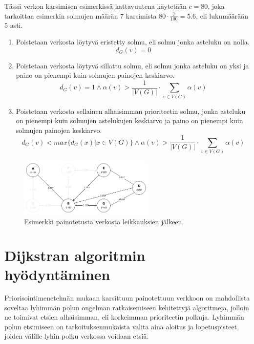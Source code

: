   Tässä verkon karsimisen esimerkissä kattavuutena käytetään \(c = 80\), joka tarkoittaa esimerkin solmujen määrän \(7\) karsimista \(80 \cdot \frac{7}{100} = 5.6\), eli lukumäärään \(5\) asti.

  \begin{enumerate}
    \item Poistetaan verkosta löytyvä eristetty solmu, eli solmu jonka asteluku on nolla.
    \[d_G(v) = 0\]
    \item Poistetaan verkosta löytyvä sillattu solmu, eli solmu jonka asteluku on yksi ja paino on pienempi kuin solmujen painojen keskiarvo.
    \[d_G(v) = 1  \land \alpha(v) > \frac{1}{|V(G)|} \cdot \sum\limits_{v \in V(G)} \alpha(v)\]
    \item Poistetaan verkosta sellainen alhaisimman prioriteetin solmu, jonka asteluku on pienempi kuin solmujen astelukujen keskiarvo ja paino on pienempi kuin solmujen painojen keskiarvo.
    \[d_G(v) < max\{d_G(x) | x \in V(G)\} \land \alpha(v) > \frac{1}{|V(G)|} \cdot \sum\limits_{v \in V(G)} \alpha(v)\]
  \end{enumerate}

  \begin{figure}[H]
    \centering
    \includegraphics[width=0.6\textwidth]{assets/painotettu-verkko-jalkeen.png}
    \caption{Esimerkki painotetusta verkosta leikkauksien jälkeen}
    \label{fig:painotettu-verkko-jalkeen}
  \end{figure}

\section{Dijkstran algoritmin hyödyntäminen} \label{ch:10_dijkstran_algoritmin_hyodyntaminen}

  Priorisointimenetelmän mukaan karsittuun painotettuun verkkoon on mahdollista soveltaa lyhimmän polun ongelman ratkaisemiseen kehitettyjä algoritmeja, jolloin ne toimivat etsien alhaisimman, eli korkeimman prioriteetin polkuja.
  Lyhimmän polun etsimiseen on tarkoituksenmukaista valita aina aloitus ja lopetuspisteet, joiden välille lyhin polku verkossa voidaan etsiä.

